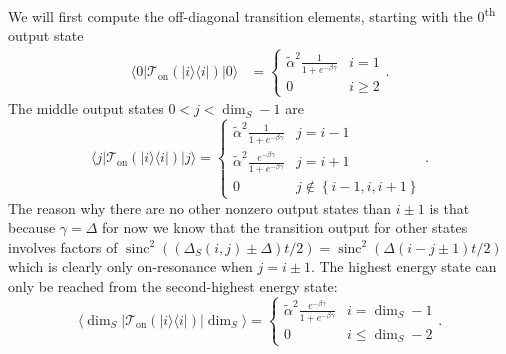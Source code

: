 \documentclass{article}
\newcommand{\on}{\text{on}}
\newcommand{\ket}[1]{|#1\rangle}
\newcommand{\bra}[1]{\langle #1|}
\newcommand{\ketbra}[2]{| #1\rangle\! \langle #2|}
\newcommand{\set}[1]{\left\{ #1 \right\}}
\newcommand{\ts}{\textsuperscript}
\DeclareMathOperator{\sinc}{sinc}
\begin{document}
We will first compute the off-diagonal transition elements, starting with the $0$\ts{th} output state
\begin{align}
    \bra{0} \mathcal{T}_{\on}(\ketbra{i}{i}) \ket{0} &= \begin{cases}
        \widetilde{\alpha}^2 \frac{1}{1 + e^{-\beta \gamma}} & i = 1 \\
        0 & i \ge 2
    \end{cases}.
\end{align}
The middle output states $0 < j < \dim_S - 1$ are 
\begin{equation}
    \bra{j} \mathcal{T}_{\on}(\ketbra{i}{i}) \ket{j} = \begin{cases}
        \widetilde{\alpha}^2 \frac{1}{1 + e^{-\beta \gamma}} & j = i - 1 \\
        \widetilde{\alpha}^2 \frac{e^{-\beta \gamma}}{1 + e^{-\beta \gamma}} & j = i + 1 \\
        0 & j \not\in \set{i - 1, i, i + 1}
    \end{cases}.
\end{equation}
The reason why there are no other nonzero output states than $i \pm 1$ is that because $\gamma = \Delta$ for now we know that the transition output for other states involves factors of $\sinc^2((\Delta_S(i, j) \pm \Delta)t/2) = \sinc^2(\Delta(i - j \pm 1) t/ 2)$ which is clearly only on-resonance when $j = i \pm 1$. The highest energy state can only be reached from the second-highest energy state:
\begin{equation}
    \bra{\dim_S} \mathcal{T}_{\on}(\ketbra{i}{i}) \ket{\dim_S} = \begin{cases}
        \widetilde{\alpha}^2 \frac{e^{-\beta \gamma}}{1 + e^{-\beta \gamma}} & i = \dim_S - 1 \\
        0 & i \le \dim_S - 2
    \end{cases}.
\end{equation}
\end{document}
